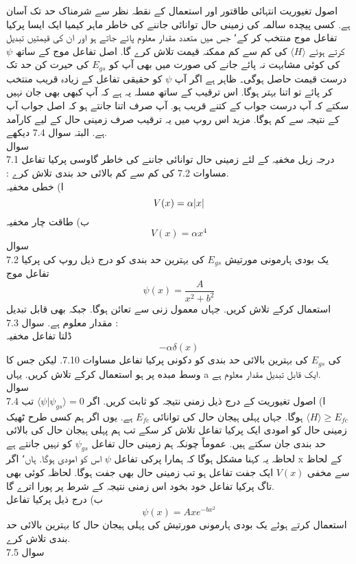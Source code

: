 \documentclass{book}
\begin{document}
اصول تغيوریت انتہائی طاقتور اور استعمال کے نقطہ نظر سے شرمناک حد تک آسان ہے. کسی پیچده سالمہ کی زمینی حال توانائی جاننے کی خاطر ماہر کیمیا ایک ایسا پرکیا تفاعل موج منتخب کر کے٬ جس میں متعدد مقدار معلوم پائے جاتے ہو اور ان کی قیمتیں تبديل کرتے ہوئے
\(  \langle H \rangle\)
کی کم سے کم ممکنہ قیمت تلاش کرے گا. اصل تفاعل موج کے ساتھ
\(\psi\) 
کی کوئی مشابہت نہ پائے جانے کی صورت میں بھی آپ کو
\( E_{gs}\)
 کی حیرت کن حد تک درست قیمت حاصل ہوگی۔ ظاہر ہے اگر آپ
\(\psi\) 
 کو حقیقی تفاعل کے زیادہ قریب منتخب کر پائے تو اتنا بہتر ہوگا. اس ترقيب کے ساتھ مسلہ یہ ہے کہ آپ کبھی بھی جان نہیں سکتے کہ آپ درست جواب کے کتنے قريب ہو. آپ صرف اتنا جانتے ہو کہ اصل جواب آپ کے نتیجہ سے كم ہوگا. مزید اس روپ میں یہ ترقيب صرف زمینی حال کے لیے کارآمد ہے.  البتہ سوال 7.4 دیکھے.\\
سوال  \\7.1
درجہ زیل مخفیہ کے لئے زمينی حال توانائی جاننے کی خاطر  گاوسی پرکیا تفاعل\\:
مساوات 7.2 کی كم سے كم بالائی حد بندی تلاش كرے.\\
ا) خطی مخفیہ
\[V(x)=\alpha\abs{x}\]
ب) طاقت چار مخفیہ
\[V(x)=\alpha x^{4}\]
سوال \\7.2
 یک بودی ہارمونی مورتیش 
 \(E_{gs}\)
  کی بہترین حد بندی کو درج ذیل روپ کی پرکیا تفاعل موج
\[\psi(x)=\frac{A}{x^{2}+b^{2}}\]
استعمال کرکے تلاش كریں. جہاں معمول زنی سے تعائن ہوگا. جبکہ بھی قابل تبديل مقدار معلوم ہے.
 سوال 7.3 : \\
 ڈلتا تفاعل مخفیہ
\[-\alpha\delta(x)\]
کی
\(E_{gs}\) 
کی بہترین بالائی حد بندی کو دکونی پرکیا تفاعل مساوات 7.10. لیکن جس کا وسط مبده پر ہو استعمال کرکے تلاش كريں. یہاں a ایک قابل تبديل مقدار معلوم ہے.\\
سوال \\7.4
ا) اصول تغيوريت کے درج ذیل زمنی نتیجہ کو ثابت کریں. اگر
\(\langle \psi | \psi_{gs} \rangle =0\)
تب
\(\langle H \rangle \ge E_{fc}\)
ہوگا. جہاں پہلی ہیجان حال کی توانائی
 \(E_{fc}\)
 ہے. یوں اگر ہم کسی طرح ٹھیک زمینی حال کو امودی ایک پرکیا تفاعل تلاش كر سکے تب ہم پہلی ہیجان حال کی بالائی حد بندی جان سکتے ہیں. عموماً چونکہ ہم زمینی حال تفاعل
 \(\psi_{gs}\)
  کو نہیں جانتے ہے لحاظہ یہ کہنا مشکل ہوگا کہ ہمارا پرکی تفاعل 
 \(\psi\)
   اس کو امودی ہوگا. ہاں٬ اگر x کے لحاظ سے مخفی
  \(V(x)\)
     ایک جفت تفاعل ہو تب زمینی حال بھی جفت ہوگا. لحاظہ کوئی بھی تاگ پرکیا تفاعل خود بخود اس زمنی نتیجہ کے شرط پر پورا اترے گا.\\
ب) درج ذیل پرکیا تفاعل
\[\psi(x)=Axe^{-bx^{2}}\]
استعمال کرتے ہوئے یک بودی ہارمونی مورتیش کی پہلی ہیجان حال کا بہترین بالائی حد بندی تلاش كرے.\\
سوال 7.5        \\
\end{document}
